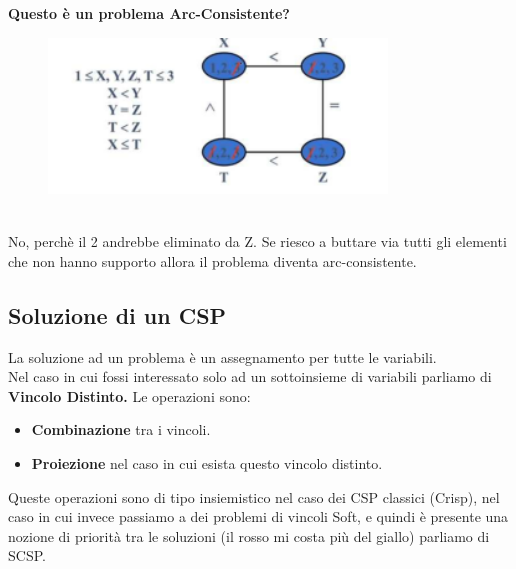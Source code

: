 \vspace{0.8cm}

\textbf{Questo è un problema Arc-Consistente?}
\begin{figure}[htp]
	\centering
    \includegraphics[width=9cm, keepaspectratio]{img/Cap3/riassunto2.png}
\end{figure}
\\No, perchè il 2 andrebbe eliminato da Z. Se riesco a buttare via tutti gli elementi che non hanno supporto allora il problema diventa arc-consistente.
\newpage
\subsection{Soluzione di un CSP}
La soluzione ad un problema è un assegnamento per tutte le variabili.
\\Nel caso in cui fossi interessato solo ad un sottoinsieme di variabili parliamo di \textbf{Vincolo Distinto.}
Le operazioni sono:
\begin{itemize}
    \item  \textbf{Combinazione} tra i vincoli.
    \item \textbf{Proiezione} nel caso in cui esista questo vincolo distinto.
\end{itemize}
Queste operazioni sono di tipo insiemistico nel caso dei CSP classici (Crisp), nel caso in cui invece passiamo a dei problemi di vincoli Soft, e quindi è presente una nozione di priorità tra le soluzioni (il rosso mi costa più del giallo) parliamo di SCSP.
